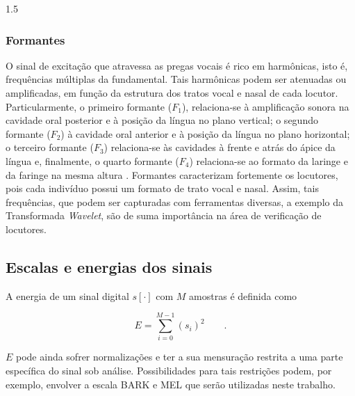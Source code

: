 \documentclass[a4paper,12pt,openright,oneside]{book}
\newenvironment{myenv}[1]
  {\begin{spacing}{#1}}
  {\end{spacing}}
\begin{document}
\begin{myenv}{1.5}
				\subsubsection{Formantes}
					\par O sinal de excitação que atravessa as pregas vocais é rico em harmônicas, isto é, frequências múltiplas da fundamental. Tais harmônicas podem ser atenuadas ou amplificadas, em função da estrutura dos tratos vocal e nasal de cada locutor. Particularmente, o primeiro formante ($F_1$), relaciona-se à  amplificação  sonora  na  cavidade  oral  posterior  e  à  posição  da  língua  no  plano  vertical;  o segundo  formante  ($F_2$)  à  cavidade  oral  anterior  e  à  posição  da  língua  no  plano  horizontal; o terceiro  formante  ($F_3$)  relaciona-se  às  cavidades  à  frente  e  atrás  do  ápice  da  língua e, finalmente,  o  quarto formante  ($F_4$) relaciona-se  ao  formato  da  laringe  e  da  faringe  na  mesma  altura  \cite{valencca2014analise}. Formantes caracterizam fortemente os locutores, pois cada indivíduo possui um formato de trato vocal e nasal. Assim, tais frequências, que podem ser capturadas com ferramentas diversas, a exemplo da Transformada \textit{Wavelet}, são de suma importância na área de verificação de locutores.
				
				\subsection{Escalas e energias dos sinais}
					\par A energia de um sinal digital $s[\cdot]$ com $M$ amostras é definida como
					
					\begin{equation}
						E = \sum\limits_{i=0}^{M-1}(s_i)^2 \qquad.   
					\end{equation}
				
					$E$ pode ainda sofrer normalizações e ter a sua mensuração restrita a uma parte específica do sinal sob análise. Possibilidades para tais restrições podem, por exemplo, envolver a escala BARK \cite{doi:10.1121-1.1908630} e MEL \cite{beranek1949acoustic} que serão utilizadas neste trabalho.

\end{myenv}
\end{document}
